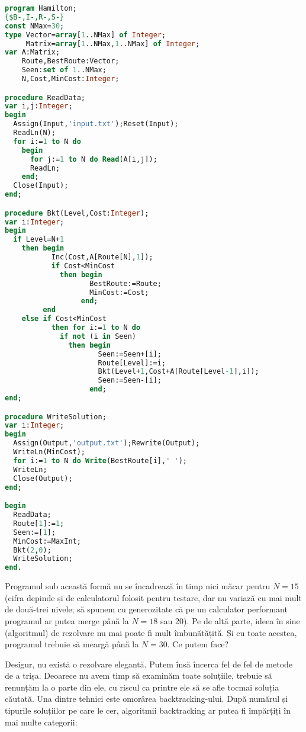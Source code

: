 \begin{lstlisting}[language=Pascal]
program Hamilton;
{$B-,I-,R-,S-}
const NMax=30;
type Vector=array[1..NMax] of Integer;
     Matrix=array[1..NMax,1..NMax] of Integer;
var A:Matrix;
    Route,BestRoute:Vector;
    Seen:set of 1..NMax;
    N,Cost,MinCost:Integer;

procedure ReadData;
var i,j:Integer;
begin
  Assign(Input,'input.txt');Reset(Input);
  ReadLn(N);
  for i:=1 to N do
    begin
      for j:=1 to N do Read(A[i,j]);
      ReadLn;
    end;
  Close(Input);
end;

procedure Bkt(Level,Cost:Integer);
var i:Integer;
begin
  if Level=N+1
    then begin
           Inc(Cost,A[Route[N],1]);
           if Cost<MinCost
             then begin
                    BestRoute:=Route;
                    MinCost:=Cost;
                  end;
         end
    else if Cost<MinCost
           then for i:=1 to N do
             if not (i in Seen)
               then begin
                      Seen:=Seen+[i];
                      Route[Level]:=i;
                      Bkt(Level+1,Cost+A[Route[Level-1],i]);
                      Seen:=Seen-[i];
                    end;
end;

procedure WriteSolution;
var i:Integer;
begin
  Assign(Output,'output.txt');Rewrite(Output);
  WriteLn(MinCost);
  for i:=1 to N do Write(BestRoute[i],' ');
  WriteLn;
  Close(Output);
end;

begin
  ReadData;
  Route[1]:=1;
  Seen:=[1];
  MinCost:=MaxInt;
  Bkt(2,0);
  WriteSolution;
end.
\end{lstlisting}

Programul sub această formă nu se încadrează în timp nici măcar pentru $N=15$
(cifra depinde și de calculatorul folosit pentru testare, dar nu variază cu
mai mult de două-trei nivele; să spunem cu generozitate că pe un calculator
performant programul ar putea merge până la $N=18$ sau 20). Pe de altă parte,
ideea în sine (algoritmul) de rezolvare nu mai poate fi mult îmbunătățită. Și
cu toate acestea, programul trebuie să meargă până la $N=30$. Ce putem face?

Desigur, nu există o rezolvare elegantă. Putem însă încerca fel de fel de
metode de a trișa. Deoarece nu avem timp să examinăm toate soluțiile, trebuie
să renunțăm la o parte din ele, cu riscul ca printre ele să se afle tocmai
soluția căutată. Una dintre tehnici este omorârea backtracking-ului. După
numărul și tipurile soluțiilor pe care le cer, algoritmii backtracking ar
putea fi împărțiți în mai multe categorii:


